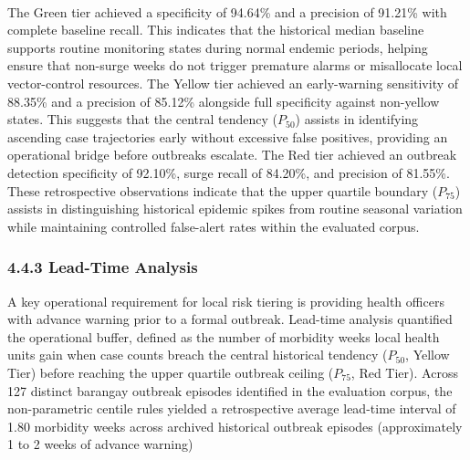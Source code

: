 \documentclass[
]{article}
\begin{document}
\paragraph{}\label{section-14}

\paragraph{}\label{section-15}

The Green tier achieved a specificity of 94.64\% and a precision of
91.21\% with complete baseline recall. This indicates that the
historical median baseline supports routine monitoring states during
normal endemic periods, helping ensure that non-surge weeks do not
trigger premature alarms or misallocate local vector-control resources.
The Yellow tier achieved an early-warning sensitivity of 88.35\% and a
precision of 85.12\% alongside full specificity against non-yellow
states. This suggests that the central tendency (\(P_{50}\)) assists in
identifying ascending case trajectories early without excessive false
positives, providing an operational bridge before outbreaks escalate.
The Red tier achieved an outbreak detection specificity of 92.10\%,
surge recall of 84.20\%, and precision of 81.55\%. These retrospective
observations indicate that the upper quartile boundary (\(P_{75}\))
assists in distinguishing historical epidemic spikes from routine
seasonal variation while maintaining controlled false-alert rates within
the evaluated corpus.

\subsubsection{\texorpdfstring{\textbf{4.4.3 Lead-Time
Analysis}}{4.4.3 Lead-Time Analysis}}\label{lead-time-analysis}

A key operational requirement for local risk tiering is providing health
officers with advance warning prior to a formal outbreak. Lead-time
analysis quantified the operational buffer, defined as the number of
morbidity weeks local health units gain when case counts breach the
central historical tendency (\(P_{50}\), Yellow Tier) before reaching
the upper quartile outbreak ceiling (\(P_{75}\), Red Tier). Across 127
distinct barangay outbreak episodes identified in the evaluation corpus,
the non-parametric centile rules yielded a retrospective average
lead-time interval of 1.80 morbidity weeks across archived historical
outbreak episodes (approximately 1 to 2 weeks of advance warning)
\end{document}
